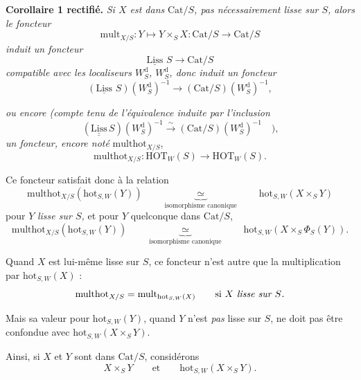 \documentclass[11pt]{article}
\newcommand{\printedpage}[1]{\marginpar{\footnotesize p.~#1}}
\newcommand{\msp}[1]{\marginpar{\footnotesize [#1]}}
\newcommand{\HOT}{\mathrm{HOT}}
\newcommand{\hot}{\mathrm{hot}}
\newcommand{\Cat}{\mathrm{Cat}}
\newcommand{\Liss}{\underline{\mathrm{Liss}}\,}
\newcommand{\multhot}{\mathrm{multhot}}
\newcommand{\mult}{\mathrm{mult}}
\begin{document}
\textbf{Corollaire 1 rectifié.} \textit{Si $X$ est dans} $\Cat/S$\textit{, pas nécessairement lisse sur $S$, alors le foncteur}
\[\mult_{X/S} : Y\longmapsto Y\times_S X : \Cat/S\longrightarrow \Cat/S\]
\textit{induit un foncteur}
\[\Liss\,S\longrightarrow \Cat/S\]
\textit{compatible avec les localiseurs $W_S^{\mathrm{d}}$, $W_S^{\mathrm{d}}$, donc induit un foncteur}
\[(\Liss\,S)(W_S^{\mathrm{d}})^{-1}\longrightarrow(\Cat/S)(W_S^{\mathrm{d}})^{-1},\]

\msp{155}
\textit{ou encore (compte tenu de l'équivalence induite par l'inclusion}
\[(\underline{\underline{\mathrm{Liss}}}\,S)(W_S^{\mathrm{d}})^{-1}\xrightarrow{\ \sim\ }(\Cat/S)(W_S^{\mathrm{d}})^{-1}\quad\textit{),}\] %
\textit{un foncteur, encore noté} $\multhot_{X/S}$,
\[\multhot_{X/S} : \HOT_W(S)\longrightarrow\HOT_W(S).\]

Ce foncteur satisfait donc à la relation
\[\multhot_{X/S}(\hot_{S,W}(Y))\qquad\underbrace{\ \simeq\ }_{\text{isomorphisme canonique}}\qquad\hot_{S,W}(X\times_S Y)\]
\printedpage{95}
pour $Y$ \textit{lisse sur $S$,} et pour $Y$ quelconque dans $\Cat/S$,
\[\multhot_{X/S}(\hot_{S,W}(Y))\qquad\underbrace{\ \simeq\ }_{\text{isomorphisme canonique}}\qquad\hot_{S,W}(X\times_S \Phi_S(Y)).\]

Quand $X$ est lui-même lisse sur $S$, ce foncteur n'est autre que la multiplication par $\hot_{S,W}(X)$ :
\[\multhot_{X/S}=\mult_{\hot_{S,W}(X)}\qquad\text{si $X$ \textit{lisse sur $S$.}}\]

Mais sa valeur pour $\hot_{S,W}(Y)$, quand $Y$ n'est \textit{pas} lisse sur $S$, ne doit pas être confondue avec $\hot_{S,W}(X\times_S Y)$.

Ainsi, si $X$ et $Y$ sont dans $\Cat/S$, considérons
\[X\times_S Y\qquad\text{et}\qquad\boxed{\hot_{S,W}(X\times_S Y).}\] %
\end{document}
